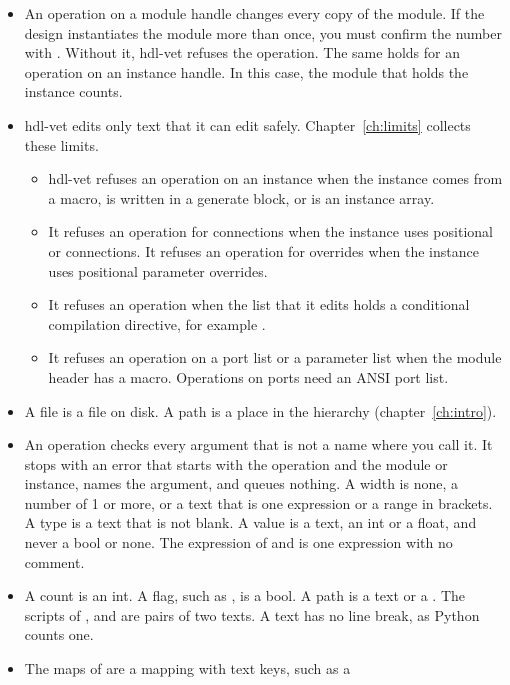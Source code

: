 \begin{itemize}
\item An operation on a module handle changes every copy of the module. If the
  design instantiates the module more than once, you must confirm the number with
  . Without it, hdl-vet refuses the operation.
  The same holds for an operation on an instance handle. In this case, the module that
  holds the instance counts.
\item hdl-vet edits only text that it can edit safely. Chapter~\ref{ch:limits}
  collects these limits.
  \begin{itemize}
  \item hdl-vet refuses an operation on an instance when the instance comes from a
    macro, is written in a generate block, or is an instance array.
  \item It refuses an operation for connections when the instance uses positional or
     connections. It refuses an operation for overrides when the instance uses
    positional parameter overrides.
  \item It refuses an operation when the list that it edits holds a conditional
    compilation directive, for example .
  \item It refuses an operation on a port list or a parameter list when the module
    header has a macro. Operations on ports need an ANSI port list.
  \end{itemize}
\item A file is a file on disk. A path is a place in the hierarchy (chapter~\ref{ch:intro}).
\item An operation checks every argument that is not a name where you call it. It stops with
  an error that starts with the operation and the module or instance, names the argument,
  and queues nothing. A width is none, a number of 1 or more, or a text that is one expression
  or a range in brackets.
  A type is a text that is not blank. A value is a text, an int or a float, and never a bool
  or none. The expression of  and  is
  one expression with no comment.
\item A count is an int. A flag, such as , is a bool. A path is a text or a
  . The scripts of ,  and
   are pairs of two texts. A text has no line break, as Python counts one.
\item The maps of  are a mapping with text keys, such as a

\end{itemize}

